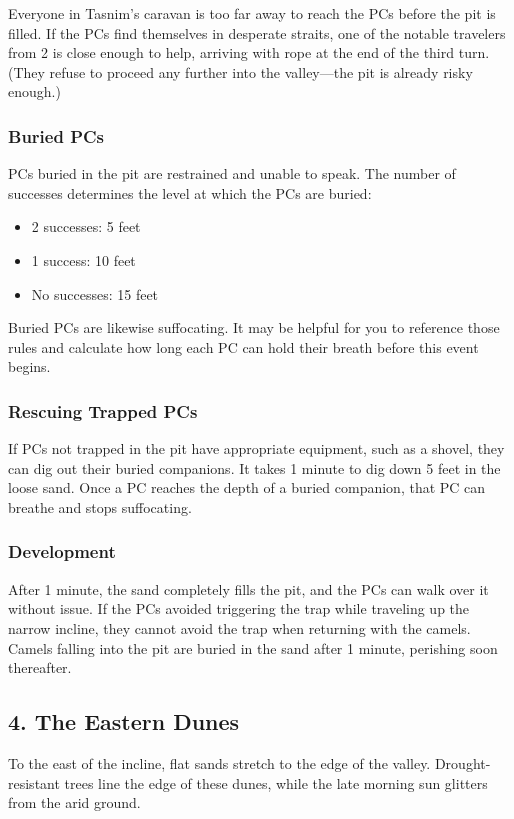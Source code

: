 \documentclass[10pt,a4paper,twoside,bg=print,twocolumn,openany,nodeprecatedcode]{dndbook}
\begin{document}
Everyone in Tasnim's caravan is too far away to reach the PCs before the pit is filled. If the PCs find themselves in desperate straits, one of the notable travelers from 2 is close enough to help, arriving with rope at the end of the third turn. (They refuse to proceed any further into the valley—the pit is already risky enough.)

\subsubsection{Buried PCs}
PCs buried in the pit are restrained and unable to speak. The number of successes determines the level at which the PCs are buried:


\begin{itemize}
\item 2 successes: 5 feet
\item 1 success: 10 feet
\item No successes: 15 feet
\end{itemize}

Buried PCs are likewise suffocating. It may be helpful for you to reference those rules and calculate how long each PC can hold their breath before this event begins.

\subsubsection{Rescuing Trapped PCs}
If PCs not trapped in the pit have appropriate equipment, such as a shovel, they can dig out their buried companions. It takes 1 minute to dig down 5 feet in the loose sand. Once a PC reaches the depth of a buried companion, that PC can breathe and stops suffocating.

\subsubsection{Development}
After 1 minute, the sand completely fills the pit, and the PCs can walk over it without issue. If the PCs avoided triggering the trap while traveling up the narrow incline, they cannot avoid the trap when returning with the camels. Camels falling into the pit are buried in the sand after 1 minute, perishing soon thereafter.

\subsection{4. The Eastern Dunes}
\begin{DndReadAloud}{}
To the east of the incline, flat sands stretch to the edge of the valley. Drought-resistant trees line the edge of these dunes, while the late morning sun glitters from the arid ground.

\end{DndReadAloud}
\end{document}
